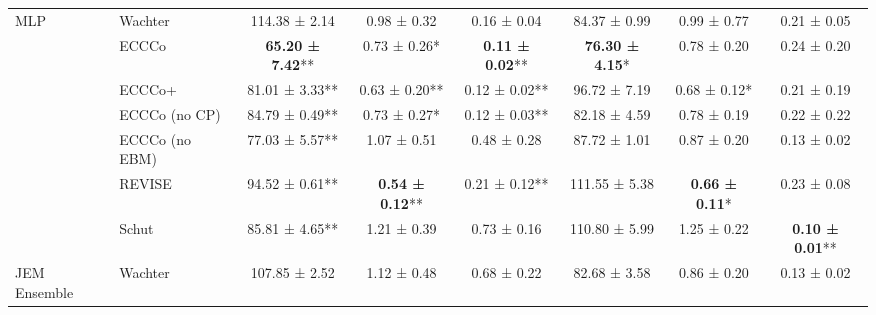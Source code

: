 \begin{table*}
{\begin{tabular}[t]{llcccccc}
\multirow{-7}{*}{\raggedright\arraybackslash MLP} & Wachter & 114.38 ± 2.14\hphantom{*}\hphantom{*} & 0.98 ± 0.32\hphantom{*}\hphantom{*} & 0.16 ± 0.04\hphantom{*}\hphantom{*} & 84.37 ± 0.99\hphantom{*}\hphantom{*} & 0.99 ± 0.77\hphantom{*}\hphantom{*} & 0.21 ± 0.05\hphantom{*}\hphantom{*}\\
\cmidrule{1-8}
 & ECCCo & \textbf{65.20 ± 7.42}** & 0.73 ± 0.26*\hphantom{*} & \textbf{0.11 ± 0.02}** & \textbf{76.30 ± 4.15}*\hphantom{*} & 0.78 ± 0.20\hphantom{*}\hphantom{*} & 0.24 ± 0.20\hphantom{*}\hphantom{*}\\

 & ECCCo+ & 81.01 ± 3.33** & 0.63 ± 0.20** & 0.12 ± 0.02** & 96.72 ± 7.19\hphantom{*}\hphantom{*} & 0.68 ± 0.12*\hphantom{*} & 0.21 ± 0.19\hphantom{*}\hphantom{*}\\

 & ECCCo (no CP) & 84.79 ± 0.49** & 0.73 ± 0.27*\hphantom{*} & 0.12 ± 0.03** & 82.18 ± 4.59\hphantom{*}\hphantom{*} & 0.78 ± 0.19\hphantom{*}\hphantom{*} & 0.22 ± 0.22\hphantom{*}\hphantom{*}\\

 & ECCCo (no EBM) & 77.03 ± 5.57** & 1.07 ± 0.51\hphantom{*}\hphantom{*} & 0.48 ± 0.28\hphantom{*}\hphantom{*} & 87.72 ± 1.01\hphantom{*}\hphantom{*} & 0.87 ± 0.20\hphantom{*}\hphantom{*} & 0.13 ± 0.02\hphantom{*}\hphantom{*}\\

 & REVISE & 94.52 ± 0.61** & \textbf{0.54 ± 0.12}** & 0.21 ± 0.12** & 111.55 ± 5.38\hphantom{*}\hphantom{*} & \textbf{0.66 ± 0.11}*\hphantom{*} & 0.23 ± 0.08\hphantom{*}\hphantom{*}\\

 & Schut & 85.81 ± 4.65** & 1.21 ± 0.39\hphantom{*}\hphantom{*} & 0.73 ± 0.16\hphantom{*}\hphantom{*} & 110.80 ± 5.99\hphantom{*}\hphantom{*} & 1.25 ± 0.22\hphantom{*}\hphantom{*} & \textbf{0.10 ± 0.01}**\\

\multirow{-7}{*}{\raggedright\arraybackslash JEM Ensemble} & Wachter & 107.85 ± 2.52\hphantom{*}\hphantom{*} & 1.12 ± 0.48\hphantom{*}\hphantom{*} & 0.68 ± 0.22\hphantom{*}\hphantom{*} & 82.68 ± 3.58\hphantom{*}\hphantom{*} & 0.86 ± 0.20\hphantom{*}\hphantom{*} & 0.13 ± 0.02\hphantom{*}\hphantom{*}\\
\bottomrule
\end{tabular}}
\end{table*}
